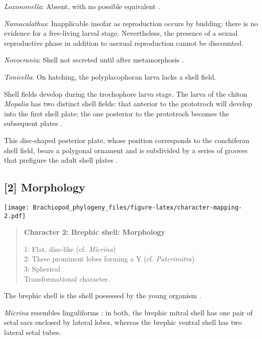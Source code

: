 \documentclass[openany]{book}
\theoremstyle{definition}
\theoremstyle{definition}
\theoremstyle{definition}
\theoremstyle{remark}
\begin{document}
\hypertarget{Loxosomella-coding-1}{}
\emph{Loxosomella}: Absent, with no possible equivalent
\citep{Nielsen1966}.

\hypertarget{Namacalathus-coding-1}{}
\emph{Namacalathus}: Inapplicable insofar as reproduction occurs by
budding; there is no evidence for a free-living larval stage.
Nevertheless, the presence of a sexual reproductive phase in addition to
asexual reproduction cannot be discounted.

\hypertarget{Novocrania-coding-1}{}
\emph{Novocrania}: Shell not secreted until after metamorphosis
\citep{Popov2010Earliestontogeny}.

\hypertarget{Tonicella-coding-1}{}
\emph{Tonicella}: On hatching, the polyplacophoran larva lacks a shell
field.

Shell fields develop during the trochophore larva stage. The larva of
the chiton \emph{Mopalia} has two distinct shell fields: that anterior
to the prototroch will develop into the first shell plate; the one
posterior to the prototroch becomes the subsequent plates
\citep{Wanninger2002C}.

This disc-shaped posterior plate, whose position corresponds to the
conchiferan shell field, bears a polygonal ornament and is subdivided by
a series of grooves that prefigure the adult shell plates
\citep{Wanninger2002C}.

\subsection*{{[}2{]} Morphology}\label{morphology}

\texttt{[image: Brachiopod\_phylogeny\_files/figure-latex/character-mapping-2.pdf]}

\begin{quote}
\textbf{Character 2: Brephic shell: Morphology}

1: Flat, disc-like (cf. \emph{Micrina})\\
2: Three prominent lobes forming a Y (cf. \emph{Paterimitra})\\
3: Spherical\\
Transformational character.
\end{quote}

The brephic shell is the shell possessed by the young organism
\citep[see][ and references therein for discussion of
terminology]{Ushatinskaya2016Revisionof}.

\emph{Micrina} resembles linguliforms \citep{Holmer2011Firstrecord}: in
both, the brephic mitral shell has one pair of setal sacs enclosed by
lateral lobes, whereas the brephic ventral shell has two lateral setal
tubes.
\end{document}
